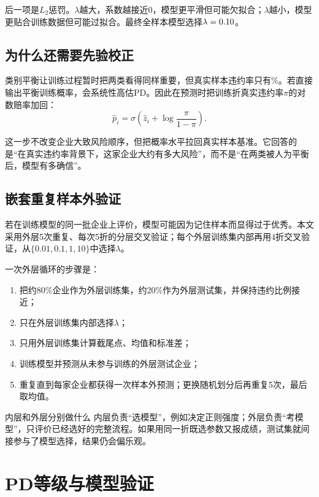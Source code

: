 \documentclass[12pt,a4paper]{ctexart}
\begin{document}
后一项是$L_2$惩罚。$\lambda$越大，系数越接近0，模型更平滑但可能欠拟合；$\lambda$越小，模型更贴合训练数据但可能过拟合。最终全样本模型选择$\lambda=0.10$。

\subsection{为什么还需要先验校正}

类别平衡让训练过程暂时把两类看得同样重要，但真实样本违约率只有\KnownDefaultRate\%。若直接输出平衡训练概率，会系统性高估PD。因此在预测时把训练折真实违约率$\pi$的对数赔率加回：
\begin{equation}
\hat p_i=\sigma\left(\hat z_i+\log\frac{\pi}{1-\pi}\right).
\end{equation}

这一步不改变企业大致风险顺序，但把概率水平拉回真实样本基准。它回答的是“在真实违约率背景下，这家企业大约有多大风险”，而不是“在两类被人为平衡后，模型有多确信”。

\subsection{嵌套重复样本外验证}

若在训练模型的同一批企业上评价，模型可能因为记住样本而显得过于优秀。本文采用外层5次重复、每次5折的分层交叉验证；每个外层训练集内部再用4折交叉验证，从$\{0.01,0.1,1,10\}$中选择$\lambda$。

一次外层循环的步骤是：

\begin{enumerate}
\item 把约80\%企业作为外层训练集，约20\%作为外层测试集，并保持违约比例接近；
\item 只在外层训练集内部选择$\lambda$；
\item 只用外层训练集计算截尾点、均值和标准差；
\item 训练模型并预测从未参与训练的外层测试企业；
\item 重复直到每家企业都获得一次样本外预测；更换随机划分后再重复5次，最后取均值。
\end{enumerate}

\begin{intuitionbox}{内层和外层分别做什么}
内层负责“选模型”，例如决定正则强度；外层负责“考模型”，只评价已经选好的完整流程。如果用同一折既选参数又报成绩，测试集就间接参与了模型选择，结果仍会偏乐观。
\end{intuitionbox}

\section{PD等级与模型验证}
\end{document}

